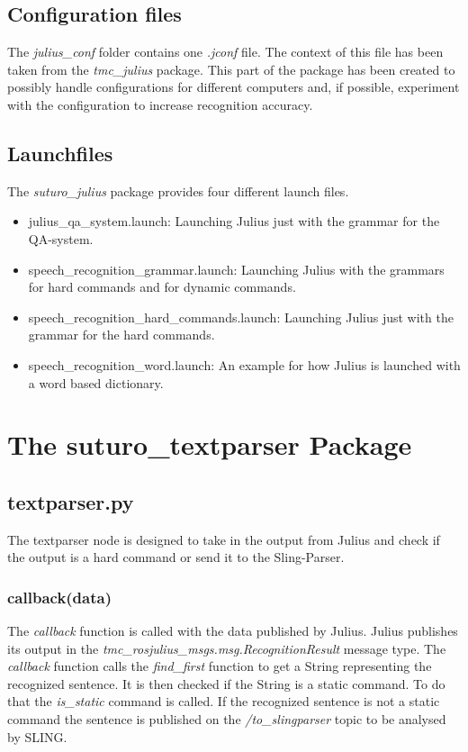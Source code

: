 \documentclass[main.tex]{subfiles}
\begin{document}
    \subsection{Configuration files}
        The \textit{julius\_conf} folder contains one \textit{.jconf} file. The context of this file has been taken from the \textit{tmc\_julius} package. This part of the package has been created to possibly handle configurations for different computers and, if possible, experiment with the configuration to increase recognition accuracy.
    \subsection{Launchfiles}
        The \textit{suturo\_julius} package provides four different launch files.\\
        \begin{itemize}
            \item julius\_qa\_system.launch:
            \subitem Launching Julius just with the grammar for the QA-system.
            \item speech\_recognition\_grammar.launch:
            \subitem Launching Julius with the grammars for hard commands and for dynamic commands.
            \item speech\_recognition\_hard\_commands.launch:
            \subitem Launching Julius just with the grammar for the hard commands.
            \item speech\_recognition\_word.launch:
            \subitem An example for how Julius is launched with a word based dictionary.
        \end{itemize}

\section{The suturo\_textparser Package}
    \subsection{textparser.py}
        The textparser node is designed to take in the output from Julius and check if the output is a hard command or send it to the Sling-Parser.
        \subsubsection{callback(data)}
            The \textit{callback} function is called with the data published by Julius. Julius publishes its output in the \textit{tmc\_rosjulius\_msgs.msg.RecognitionResult} message type. The \textit{callback} function calls the \textit{find\_first} function to get a String representing the recognized sentence. It is then checked if the String is a static command. To do that the \textit{is\_static} command is called. If the recognized sentence is not a static command the sentence is published on the \textit{/to\_slingparser} topic to be analysed by SLING.
    
\end{document}
